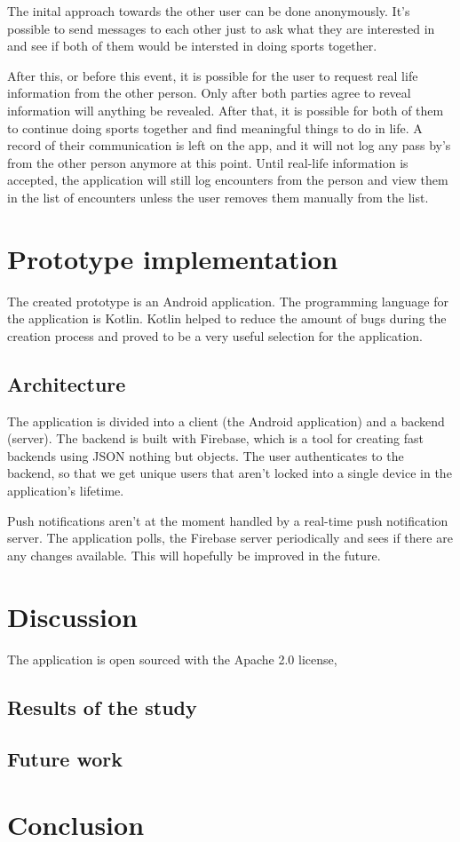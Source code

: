 The inital approach towards the other user can be done anonymously. It's possible to send messages to each other just to ask what they are interested in and see if both of them would be intersted in doing sports together.

After this, or before this event, it is possible for the user to request real life information from the other person. Only after both parties agree to reveal information will anything be revealed. After that, it is possible for both of them to continue doing sports together and find meaningful things to do in life. A record of their communication is left on the app, and it will not log any pass by's from the other person anymore at this point. Until real-life information is accepted, the application will still log encounters from the person and view them in the list of encounters unless the user removes them manually from the list.

\section{Prototype implementation}

The created prototype is an Android application. The programming language for the application is Kotlin. Kotlin helped to reduce the amount of bugs during the creation process and proved to be a very useful selection for the application.

\subsection{Architecture}

The application is divided into a client (the Android application) and a backend (server). The backend is built with Firebase, which is a tool for creating fast backends using JSON nothing but objects. The user authenticates to the backend, so that we get unique users that aren't locked into a single device in the application's lifetime.

Push notifications aren't at the moment handled by a real-time push notification server. The application polls, the Firebase server periodically and sees if there are any changes available. This will hopefully be improved in the future.

\section{Discussion}

The application is open sourced with the Apache 2.0 license,
\subsection{Results of the study}
\subsection{Future work}

\section{Conclusion}


